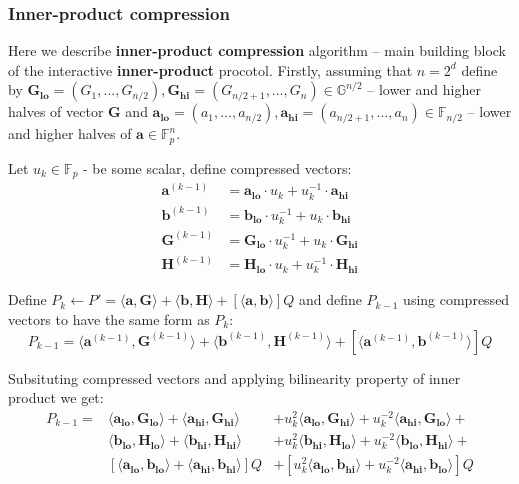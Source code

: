 \documentclass[../lecture-notes-148x210.tex]{subfiles}
\begin{document}
\subsubsection{Inner-product compression}

Here we describe \textbf{inner-product compression} algorithm -- main building block of the interactive \textbf{inner-product} procotol.
Firstly, assuming that $n = 2^d$ define by $\mathbf{G_{lo}} = (G_1, \dots, G_{n/2}), \mathbf{G_{hi}} = (G_{n/2+1},\dots, G_n) \in \mathbb{G}^{n/2}$ -- lower and higher halves of vector $\mathbf{G}$ and $\mathbf{a_{lo}} = (a_1, \dots, a_{n/2}), \mathbf{a_{hi}} = (a_{n/2+1},\dots,a_n) \in \mathbb{F}_{n/2}$ -- lower and higher halves of $\mathbf{a} \in \mathbb{F}_p^{n}$.

Let $u_k \in \mathbb{F}_p$ - be some scalar, define compressed vectors:
\begin{align*}
    \mathbf{a}^{(k-1)} &= \mathbf{a_{lo}} \cdot u_k + u_k^{-1} \cdot \mathbf{a_{hi}} \\
    \mathbf{b}^{(k-1)} &= \mathbf{b_{lo}} \cdot u_k^{-1} + u_k \cdot \mathbf{b_{hi}} \\
    \mathbf{G}^{(k-1)} &= \mathbf{G_{lo}} \cdot u_k^{-1} + u_k \cdot \mathbf{G_{hi}} \\
    \mathbf{H}^{(k-1)} &= \mathbf{H_{lo}} \cdot u_k + u_k^{-1} \cdot \mathbf{H_{hi}}
\end{align*}

Define $P_k \gets P' =  \langle \mathbf{a,G} \rangle + \langle \mathbf{b,H} \rangle + [\langle \mathbf{a,b} \rangle]Q$ and define $P_{k-1}$ using compressed vectors to have the same form as $P_k$:
$$P_{k-1} = \langle \mathbf{a}^{(k-1)}, \mathbf{G}^{(k-1)} \rangle + \langle \mathbf{b}^{(k-1)}, \mathbf{H}^{(k-1)} \rangle + [\langle \mathbf{a}^{(k-1)}, \mathbf{b}^{(k-1)} \rangle]Q $$

Subsituting compressed vectors and applying bilinearity property of inner product we get:
\begin{align*}
    P_{k-1} = & \langle \mathbf{a_{lo}}, \mathbf{G_{lo}}\rangle + \langle \mathbf{a_{hi}}, \mathbf{G_{hi}}\rangle &+ u_k^2\langle \mathbf{a_{lo}}, \mathbf{G_{hi}}\rangle + u_k^{-2}\langle \mathbf{a_{hi}}, \mathbf{G_{lo}}\rangle + \\
    & \langle \mathbf{b_{lo}}, \mathbf{H_{lo}}\rangle + \langle \mathbf{b_{hi}}, \mathbf{H_{hi}}\rangle &+ u_k^2\langle \mathbf{b_{hi}}, \mathbf{H_{lo}}\rangle + u_k^{-2}\langle \mathbf{b_{lo}}, \mathbf{H_{hi}}\rangle + \\
    & [\langle \mathbf{a_{lo}}, \mathbf{b_{lo}}\rangle + \langle \mathbf{a_{hi}}, \mathbf{b_{hi}}\rangle]Q &+ [u_k^2\langle \mathbf{a_{lo}}, \mathbf{b_{hi}}\rangle + u_k^{-2}\langle \mathbf{a_{hi}}, \mathbf{b_{lo}}\rangle]Q
\end{align*}
\end{document}
